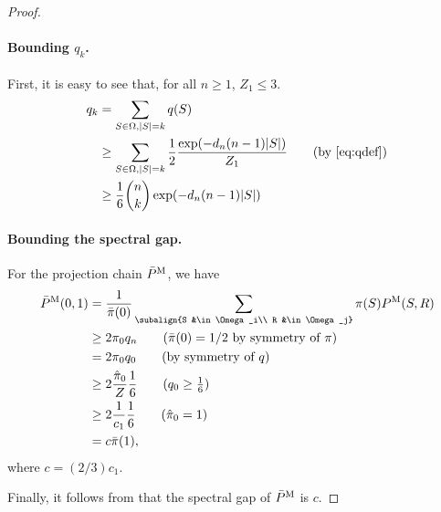 \begin{proof}
\paragraph{Bounding $q_k$.}
First, it is easy to see that, for all $n \geq 1$, $Z_1 \leq 3$.
\begin{align*}
  q_k &= \sum_{S \in \Omega, |S| = k} q(S)\\
      &\geq \sum_{S \in \Omega, |S| = k} \frac{1}{2} \frac{\exp(-\dn (n-1)|S|)}{Z_1} \tag{by \eqref{eq:qdef}} \\
      &\geq \frac{1}{6} \binom{n}{k} \exp(-\dn (n-1)|S|)
\end{align*}

\paragraph{Bounding the spectral gap.}
For the projection chain $\bar{P}^{\mathrm{M}}$, we have
\begin{align*}
\bPm(0, 1) &= \frac{1}{\bar{\pi}(0)} \sum_{\subalign{S &\in \Omega_i\\ R &\in \Omega_j}} \pi(S) \Pm(S, R)\\
           &\geq 2\pi_0 q_n \tag{$\bar{\pi}(0) = 1/2$ by symmetry of $\pi$}\\
           &= 2\pi_0 q_0 \tag{by symmetry of $q$}\\
           &\geq 2\frac{\hat{\pi}_0}{Z} \frac{1}{6} \tag{$q_0 \geq \frac{1}{6}$}\\
           &\geq 2\frac{1}{c_1}\frac{1}{6} \tag{$\hat{\pi}_0 = 1$}\\
           &= c \bar{\pi}(1),
\end{align*}
where $c = (2/3)c_1$.

Finally, it follows from  that the spectral gap of $\bar{P}^{\mathrm{M}}$ is $c$.

\end{proof}

